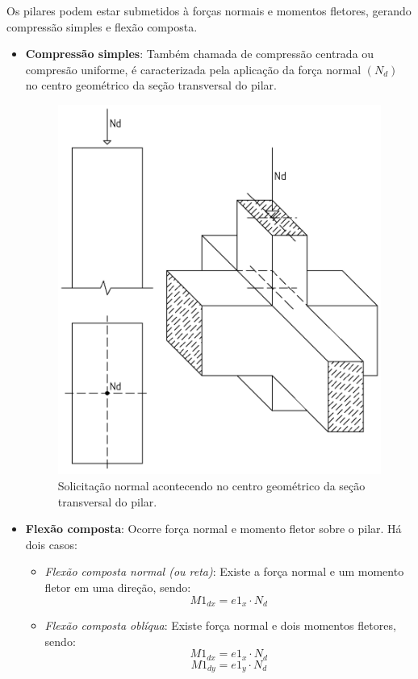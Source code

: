 Os pilares podem estar submetidos à forças normais e momentos fletores, gerando compressão simples e flexão composta.

\begin{itemize}

	\item \textbf{Compressão simples}: Também chamada de compressão centrada ou compresão uniforme, é caracterizada pela aplicação da força normal $(N_d)$ no centro geométrico da seção transversal do pilar.

		\begin{figure}[H]
			\begin{center}
				\caption{Solicitação normal acontecendo no centro geométrico da seção transversal do pilar.}    	
				\includegraphics[height=0.5\textwidth]{Solicitacoes-normais/Imagens/Compressao-simples.png}
			\end{center}
		\end{figure}

	\item \textbf{Flexão composta}: Ocorre força normal e momento fletor sobre o pilar. Há dois casos:

		\begin{itemize}
     			\item \textit{Flexão composta normal (ou reta)}: Existe a força normal e um momento fletor em uma direção, sendo:
				$$M1_{dx}=e1_x\cdot N_d$$
				
     			\item \textit{Flexão composta oblíqua}: Existe força normal e dois momentos fletores, sendo:
				$$M1_{dx}=e1_x\cdot N_d$$
				$$M1_{dy}=e1_y\cdot N_d$$
  		\end{itemize}

\end{itemize}

